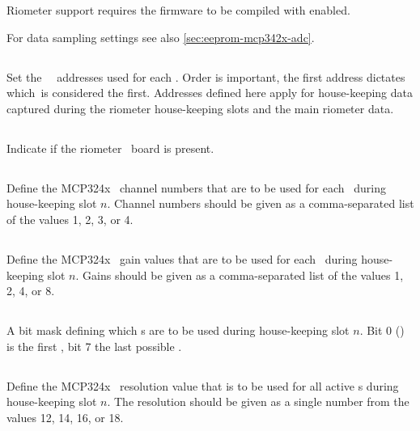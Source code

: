 Riometer support requires the firmware to be compiled with
 enabled.

For data sampling settings see also \ref{sec:eeprom-mcp342x-adc}.

\subsection[generic-adc-address-list]{}
Set the \adc\ \itwoc\ addresses used for each \adc. Order is
important, the first address dictates which\adc\ is considered the
first. Addresses defined here apply for house-keeping data captured
during the riometer house-keeping slots and the main riometer data.

\subsection[rio-present]{}
Indicate if the riometer \adc\ board is present.

\subsection[rio-housekeeping-n-adc-channel-list]{}
Define the MCP324x \adc\ channel numbers that are to be used for each
\adc\ during house-keeping slot $n$. Channel numbers should be given
as a comma-separated list of the values 1, 2, 3, or 4.

\subsection[rio-housekeeping-n-adc-gain-list]{}
Define the MCP324x \adc\ gain values that are to be used for each
\adc\ during house-keeping slot $n$. Gains should be given as a
comma-separated list of the values 1, 2, 4, or 8.

\subsection[rio-housekeeping-n-adc-mask]{}
A bit mask defining which \adc s are to be used during house-keeping
slot $n$. Bit 0 (\lsb) is the first \adc, bit 7 the last possible
\adc.

\subsection[rio-housekeeping-n-adc-resolution]{}
Define the MCP324x \adc\ resolution value that is to be used for all
active \adc s during house-keeping slot $n$. The resolution should be
given as a single number from the values 12, 14, 16, or 18.

